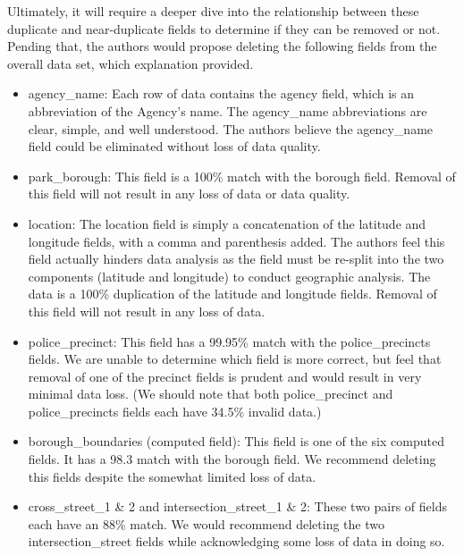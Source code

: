 \documentclass[12pt, titlepage]{article}
\begin{document}
{Ultimately, it will require a deeper dive into the relationship between these duplicate and near-duplicate fields to
 determine if they can be removed or not. Pending that, the authors would propose deleting the following fields
 from the overall data set, which explanation provided.
 
 	\begin{itemize}
		    \item agency\_name: Each row of data contains the agency field, which is an abbreviation of the Agency's name.
		    The agency\_name abbreviations are clear, simple, and well understood. The authors believe the agency\_name field could
		    be eliminated without loss of data quality. 
		    
		    \item park\_borough:  This field is a 100\% match with the borough field. Removal of this field will not result in any loss
		    of data or data quality.
		    
		    \item location:  The location field is simply a concatenation of the latitude and longitude fields, with a comma and 
		    parenthesis added. The authors feel this field actually hinders data analysis as the
		    field must be re-split into the two components (latitude and longitude) to conduct geographic analysis.
		     The data is a 100\% duplication of the latitude and longitude fields. Removal of this field will
		    not result in any loss of data.
		    
		    \item police\_precinct: This field has a 99.95\% match with the police\_precincts fields. We are unable to determine which
		    field is more correct, but feel that removal of one of the precinct fields is prudent and would result in very minimal 
		    data loss. (We should note that both police\_precinct and police\_precincts fields each have 34.5\% invalid data.)
		   
		   \item borough\_boundaries (computed field): This field is one of the six computed fields. It has a 98.3 match with the
		    borough field. We recommend deleting this fields despite the somewhat limited loss of data. 
		    
		    \item cross\_street\_1 \& 2 and intersection\_street\_1 \& 2: These two pairs of fields each have an 88\% match. We would
		    recommend deleting the two intersection\_street fields while acknowledging some loss of data in doing so.
		     

\end{itemize}}
\end{document}
